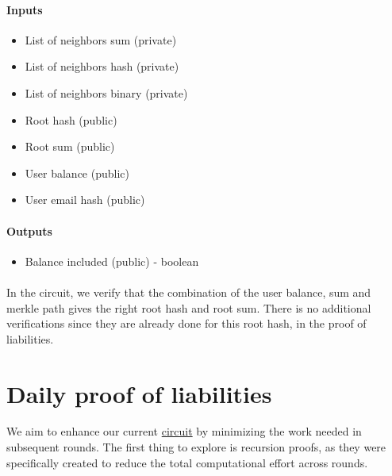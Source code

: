 \paragraph{Inputs}
\begin{itemize}


   \item List of neighbors sum (private)
  
   \item List of neighbors hash (private)


   \item List of neighbors binary (private)


   \item Root hash (public)


   \item Root sum (public)


   \item User balance (public)


   \item User email hash (public)
  
   \end{itemize}


\paragraph{Outputs}
\begin{itemize}
   \item Balance included (public) - boolean
   \end{itemize}


\paragraph{}
In the circuit, we verify that the combination of the user balance, sum and merkle path gives the right root hash and root sum. There is no additional
verifications since they are already done for this root hash, in the proof of liabilities.




\section{Daily proof of liabilities}
We aim to enhance our current \hyperref[subsec:pl]{circuit} by minimizing the work needed in subsequent rounds.
The first thing to explore is recursion proofs, as they were specifically created to reduce the total computational effort across rounds.




